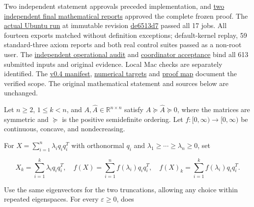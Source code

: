 \documentclass[11pt,a4paper]{article}
\begin{document}
Two independent statement approvals preceded implementation, and
\href{https://github.com/ajt60gaibb/OpenProblemsInNLA/blob/main/randomized-and-low-rank-approximation/RA-08/lean/README.md\#review-and-checks-actually-performed}{two
independent final mathematical reports} approved the complete frozen
proof. The
\href{https://github.com/sgstepaniants/OpenProblemsInNLA/actions/runs/34735273999}{actual
Ubuntu run} at immutable revision
\href{https://github.com/sgstepaniants/OpenProblemsInNLA/tree/de6513d726e3f66d20730fdaef5ba99318ee7e8b/randomized-and-low-rank-approximation/RA-08/lean}{de6513d7}
passed all 17 jobs. All fourteen exports matched without definition
exceptions; default-kernel replay, 59 standard-three axiom reports and
both real control suites passed as a non-root user. The
\href{https://github.com/ajt60gaibb/OpenProblemsInNLA/blob/main/randomized-and-low-rank-approximation/RA-08/lean/verification/linux-2026-09-12/OPERATIONAL-REVIEW.md}{independent
operational audit} and
\href{https://github.com/ajt60gaibb/OpenProblemsInNLA/blob/main/randomized-and-low-rank-approximation/RA-08/lean/verification/root-operational-2026-09-12/ROOT-CHECKS.json}{coordinator
acceptance} bind all 613 submitted inputs and original evidence. Local
Mac checks are separately identified. The
\href{https://github.com/ajt60gaibb/OpenProblemsInNLA/blob/main/randomized-and-low-rank-approximation/RA-08/lean/formalization.yaml}{v0.4
manifest},
\href{https://github.com/ajt60gaibb/OpenProblemsInNLA/blob/main/randomized-and-low-rank-approximation/RA-08/lean/NUMERICAL_TARGETS.md}{numerical
targets} and
\href{https://github.com/ajt60gaibb/OpenProblemsInNLA/blob/main/randomized-and-low-rank-approximation/RA-08/lean/PROOF_MAP.md}{proof
map} document the verified scope. The original mathematical statement
and sources below are unchanged.

Let \(n\ge2\), \(1\le k< n\), and
\(A,\widehat A\in\mathbb R^{n\times n}\) satisfy
\(A\succeq\widehat A\succeq0\), where the matrices are symmetric and
\(\succeq\) is the positive semidefinite ordering. Let
\(f:[0,\infty)\to[0,\infty)\) be continuous, concave, and nondecreasing.

For \(X=\sum_{i=1}^n\lambda_iq_iq_i^T\) with orthonormal \(q_i\) and
\(\lambda_1\ge\cdots\ge\lambda_n\ge0\), set

\[X_k=\sum_{i=1}^k\lambda_iq_iq_i^T,
\quad f(X)=\sum_{i=1}^nf(\lambda_i)q_iq_i^T,
\quad f(X)_k=\sum_{i=1}^kf(\lambda_i)q_iq_i^T.\]

Use the same eigenvectors for the two truncations, allowing any choice
within repeated eigenspaces. For every \(\varepsilon\ge0\), does
\end{document}
